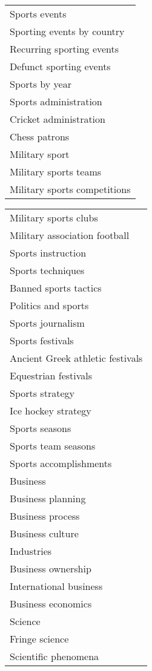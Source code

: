 \begin{table*}[h]
\begin{minipage}{0.48\textwidth}
\begin{tabular}{|l|}
Sports events \\
Sporting events by country \\
Recurring sporting events \\
Defunct sporting events \\
Sports by year \\
Sports administration \\
Cricket administration \\
Chess patrons \\
Military sport \\
Military sports teams \\
Military sports competitions \\
\hline
\end{tabular}
\end{minipage}
\hfill %
\begin{minipage}{0.48\textwidth}
\centering
\begin{tabular}{|l|}
\hline
Military sports clubs \\
Military association football \\
Sports instruction \\
Sports techniques \\
Banned sports tactics \\
Politics and sports \\
Sports journalism \\
Sports festivals \\
Ancient Greek athletic festivals \\
Equestrian festivals \\
Sports strategy \\
Ice hockey strategy \\
Sports seasons \\
Sports team seasons \\
Sports accomplishments \\
Business \\
Business planning \\
Business process \\
Business culture \\
Industries \\
Business ownership \\
International business \\
Business economics \\
Science \\
Fringe science \\
Scientific phenomena \\

\end{tabular}
\end{minipage}
\end{table*}
